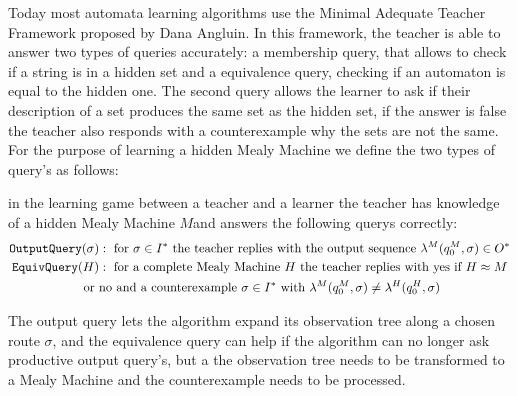 Today most automata learning algorithms use the Minimal Adequate Teacher Framework proposed by Dana Angluin. In this framework, the teacher is able to answer two types of queries accurately: a membership query, that allows to check if a string is in a hidden set and a equivalence query, checking if an automaton is equal to the hidden one. The second query allows the learner to ask if their description of a set produces the same set as the hidden set, if the answer is false the teacher also responds with a counterexample why the sets are not the same.\cite{angluin}\\
For the purpose of learning a hidden Mealy Machine we define the two types of query's as follows:
\begin{definition}\label{def:queries}
	in the learning game between a teacher and a learner the teacher has knowledge of a hidden Mealy Machine $M$and answers the following querys correctly:
	\begin{gather*}\textnormal{\texttt{OutputQuery}}(\sigma): \text{ for }\sigma\in I^*\text{ the teacher replies with the output sequence } \lambda^M(q_0^M,\sigma)\in O^*\\
	\textnormal{\texttt{EquivQuery}}(H):\text{ for a complete Mealy Machine } H \text{ the teacher replies with yes if }H\approx M\\\text{ or no and a counterexample } \sigma\in I^*\text{ with }\lambda^M(q_0^M,\sigma)\neq\lambda^H(q_0^H,\sigma)
	\end{gather*}
\end{definition}
The output query lets the algorithm expand its observation tree along a chosen route $\sigma$, and the equivalence query can help if the algorithm can no longer ask productive output query's, but a the observation tree needs to be transformed to a Mealy Machine and the counterexample needs to be processed.

